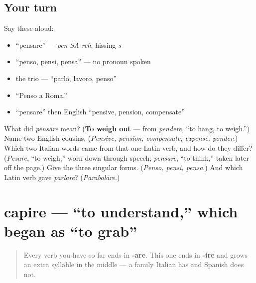 \subsection*{Your turn}
Say these aloud:

\begin{itemize}
\raggedright
  \item \textquotedblleft{}pensare\textquotedblright{} — \emph{pen-SA-reh}, hissing \emph{s}
  \item \textquotedblleft{}penso, pensi, pensa\textquotedblright{} — no pronoun spoken
  \item the trio — \textquotedblleft{}parlo, lavoro, penso\textquotedblright{}
  \item \textquotedblleft{}Penso a Roma.\textquotedblright{}
  \item \textquotedblleft{}pensare\textquotedblright{} then English \textquotedblleft{}pensive, pension, compensate\textquotedblright{}
\end{itemize}

\begin{tcolorbox}[breakable,colback=teal!4,colframe=teal!35!black,title={Before you move on}]
What did \emph{pēnsāre} mean? (\textbf{To weigh out} — from \emph{pendere}, \textquotedblleft{}to hang, to weigh.\textquotedblright{}) Name two English cousins. (\emph{Pensive, pension, compensate, expense, ponder}.) Which two Italian words came from that one Latin verb, and how do they differ? (\emph{Pesare}, \textquotedblleft{}to weigh,\textquotedblright{} worn down through speech; \emph{pensare}, \textquotedblleft{}to think,\textquotedblright{} taken later off the page.) Give the three singular forms. (\emph{Penso, pensi, pensa}.) And which Latin verb gave \emph{parlare}? (\emph{Parabolāre}.)
\end{tcolorbox}
\section[capire]{capire — \textquotedblleft{}to understand,\textquotedblright{} which began as \textquotedblleft{}to grab\textquotedblright{}}

\label{lesson:IT-C18-capire}



\begin{quote}
Every verb you have so far ends in \textbf{-are}. This one ends in \textbf{-ire} and grows an extra syllable in the middle — a family Italian has and Spanish does not.
\end{quote}

